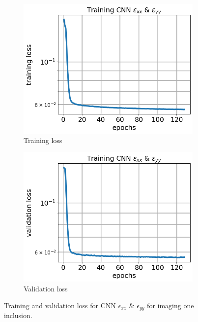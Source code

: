 \documentclass[12pt]{article}
\newcommand{\nhgfigheight}{4.0cm}
\begin{document}
%
\begin{figure}[h]
  \centering
  \begin{subfigure}[b]{0.45\linewidth}
    \includegraphics[totalheight=\nhgfigheight]{Figures/final1/training/exxeyy/field_strainxxyy_plot_loss.png}
    \caption{Training loss}
  \end{subfigure}
  \begin{subfigure}[b]{0.45\linewidth}
    \includegraphics[totalheight=\nhgfigheight]{Figures/final1/training/exxeyy/field_strainxxyy_plot_val_loss.png}
    \caption{Validation loss}
  \end{subfigure}
\caption{\label{fig:oneinc:trainexxeyy} Training and validation loss for CNN $\epsilon_{xx}$ \& $\epsilon_{yy}$ for imaging one inclusion.}
\end{figure}
\end{document}
